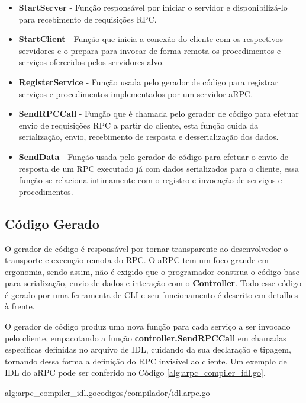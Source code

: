 \begin{itemize}
	\item \textbf{StartServer} - Função responsável por iniciar o servidor e disponibilizá-lo para recebimento de requisições RPC.
	\item \textbf{StartClient} - Função que inicia a conexão do cliente com os respectivos servidores e o prepara para invocar de forma remota os procedimentos e serviços oferecidos pelos servidores alvo.
	\item \textbf{RegisterService} - Função usada pelo gerador de código para registrar serviços e procedimentos implementados por um servidor aRPC.
	\item \textbf{SendRPCCall} - Função que é chamada pelo gerador de código para efetuar envio de requisições RPC a partir do cliente, esta função cuida da serialização, envio, recebimento de resposta e desserialização dos dados.
	\item \textbf{SendData} - Função usada pelo gerador de código para efetuar o envio de resposta de um RPC executado já com dados serializados para o cliente, essa função se relaciona intimamente com o registro e invocação de serviços e procedimentos.
\end{itemize}

\subsection{Código Gerado}

O gerador de código é responsável por tornar transparente ao desenvolvedor o transporte e execução remota do RPC. O aRPC tem um foco grande em ergonomia, sendo assim, não é exigido que o programador construa o código base para serialização, envio de dados e interação com o \textbf{Controller}. Todo esse código é gerado por uma ferramenta de CLI e seu funcionamento  é descrito em detalhes à frente.

O gerador de código produz uma nova função para cada serviço a ser invocado pelo cliente, empacotando a função \textbf{controller.SendRPCCall} em chamadas específicas definidas no arquivo de IDL, cuidando da sua declaração e tipagem, tornando dessa forma a definição do RPC invisível ao cliente. Um exemplo de IDL do aRPC pode ser conferido no Código \ref{alg:arpc_compiler_idl.go}.

 {alg:arpc_compiler_idl.go}{codigos/compilador/idl.arpc.go}{}

